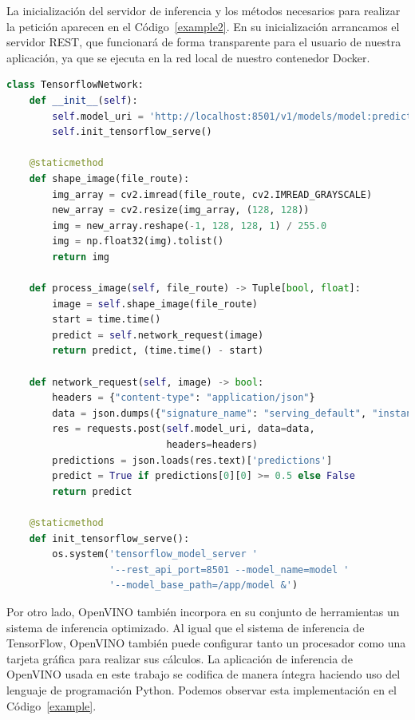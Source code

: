 La inicialización del servidor de inferencia y los métodos necesarios para realizar la petición aparecen en el Código~\ref{example2}. En su inicialización arrancamos el servidor REST, que funcionará de forma transparente para el usuario de nuestra aplicación, ya que se ejecuta en la red local de nuestro contenedor Docker.

\begin{lstlisting}[caption=Código Python para la red de inferencia de TensorFlow.,
      label=b_label,
      language=Python,label={example2}]
class TensorflowNetwork:
    def __init__(self):
        self.model_uri = 'http://localhost:8501/v1/models/model:predict'
        self.init_tensorflow_serve()

    @staticmethod
    def shape_image(file_route):
        img_array = cv2.imread(file_route, cv2.IMREAD_GRAYSCALE)
        new_array = cv2.resize(img_array, (128, 128))
        img = new_array.reshape(-1, 128, 128, 1) / 255.0
        img = np.float32(img).tolist()
        return img

    def process_image(self, file_route) -> Tuple[bool, float]:
        image = self.shape_image(file_route)
        start = time.time()
        predict = self.network_request(image)
        return predict, (time.time() - start)

    def network_request(self, image) -> bool:
        headers = {"content-type": "application/json"}
        data = json.dumps({"signature_name": "serving_default", "instances": image})
        res = requests.post(self.model_uri, data=data,
                            headers=headers)
        predictions = json.loads(res.text)['predictions']
        predict = True if predictions[0][0] >= 0.5 else False
        return predict

    @staticmethod
    def init_tensorflow_serve():
        os.system('tensorflow_model_server '
                  '--rest_api_port=8501 --model_name=model '
                  '--model_base_path=/app/model &')
\end{lstlisting}

Por otro lado, OpenVINO también incorpora en su conjunto de herramientas un sistema de inferencia optimizado.
Al igual que el sistema de inferencia de TensorFlow, OpenVINO también puede configurar tanto un procesador como una tarjeta gráfica para realizar sus cálculos.
La aplicación de inferencia de OpenVINO usada en este trabajo se codifica de manera íntegra haciendo uso del lenguaje de programación Python. Podemos observar esta implementación en el Código~\ref{example}.

